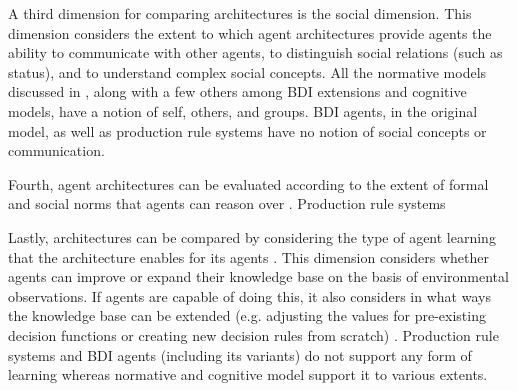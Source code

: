 A third dimension for comparing architectures is the social dimension.
This dimension considers the extent to which agent architectures provide agents the ability to communicate with other agents, to distinguish social relations (such as status), and to understand complex social concepts.
All the normative models discussed in \cite{balke_how_2014}, along with a few others among BDI extensions and cognitive models, have a notion of self, others, and groups.
BDI agents, in the original model, as well as production rule systems have no notion of social concepts or communication.

Fourth, agent architectures can be evaluated according to the extent of formal and social norms that agents can reason over \cite{balke_how_2014}.
Production rule systems

Lastly, architectures can be compared by considering the type of agent learning that the architecture enables for its agents \cite{balke_how_2014}.
This dimension considers whether agents can improve or expand their knowledge base on the basis of environmental observations.
If agents are capable of doing this, it also considers in what ways the knowledge base can be extended (e.g. adjusting the values for pre-existing decision functions or creating new decision rules from scratch) \cite{balke_how_2014}.
Production rule systems and BDI agents (including its variants) do not support any form of learning whereas normative and cognitive model support it to various extents.
